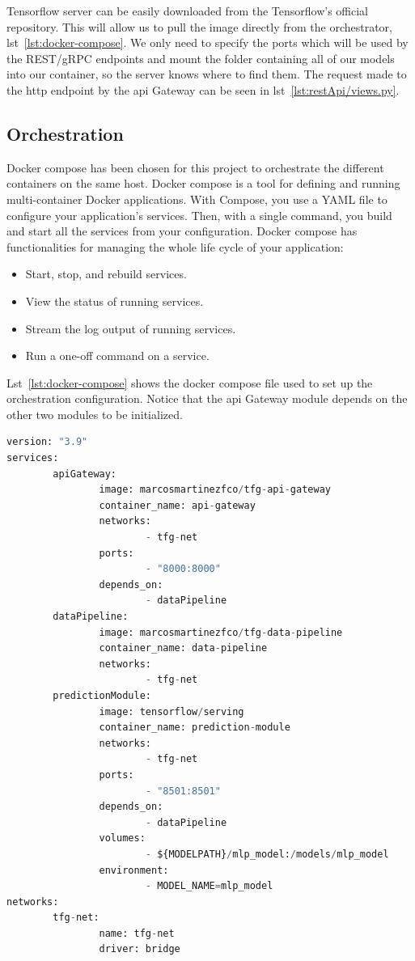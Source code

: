 Tensorflow server can be easily downloaded from the Tensorflow's official repository. This will allow us to pull the image directly from the orchestrator, lst~\ref{lst:docker-compose}. We only need to specify the ports which will be used by the REST/gRPC endpoints and mount the folder containing all of our models into our container, so the server knows where to find them. The request made to the http endpoint by the \gls{api} Gateway can be seen in lst~\ref{lst:restApi/views.py}.

\subsection{Orchestration}

Docker compose has been chosen for this project to orchestrate the different containers on the same host. Docker compose is a tool for defining and running multi-container Docker applications. With Compose, you use a YAML file to configure your application’s services. Then, with a single command, you build and start all the services from your configuration. Docker compose has functionalities for managing the whole life cycle of your application:~\cite{dockerCompose}

\begin{itemize}
    \item Start, stop, and rebuild services.
    \item View the status of running services.
    \item Stream the log output of running services.
    \item Run a one-off command on a service.
\end{itemize}

Lst~\ref{lst:docker-compose} shows the docker compose file used to set up the orchestration configuration. Notice that the \gls{api} Gateway module depends on the other two modules to be initialized. 

\newpage
\begin{lstlisting}[language=python,caption=docker-compose.yaml,label={lst:docker-compose}]
version: "3.9"
services:
        apiGateway:
                image: marcosmartinezfco/tfg-api-gateway
                container_name: api-gateway
                networks:
                        - tfg-net
                ports:
                        - "8000:8000"
                depends_on:
                        - dataPipeline
        dataPipeline:
                image: marcosmartinezfco/tfg-data-pipeline
                container_name: data-pipeline
                networks:
                        - tfg-net
        predictionModule:
                image: tensorflow/serving
                container_name: prediction-module
                networks:
                        - tfg-net
                ports:
                        - "8501:8501"
                depends_on:
                        - dataPipeline
                volumes:
                        - ${MODELPATH}/mlp_model:/models/mlp_model
                environment:
                        - MODEL_NAME=mlp_model
networks:
        tfg-net:
                name: tfg-net
                driver: bridge
\end{lstlisting}

